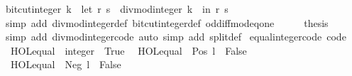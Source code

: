 \begin{isabellebody}
\ {\isachardoublequoteopen}bit{\isacharunderscore}{\kern0pt}cut{\isacharunderscore}{\kern0pt}integer\ k\ {\isacharequal}{\kern0pt}\ {\isacharparenleft}{\kern0pt}let\ {\isacharparenleft}{\kern0pt}r{\isacharcomma}{\kern0pt}\ s{\isacharparenright}{\kern0pt}\ {\isacharequal}{\kern0pt}\ divmod{\isacharunderscore}{\kern0pt}integer\ k\ {}\ in\ {\isacharparenleft}{\kern0pt}r{\isacharcomma}{\kern0pt}\ s\ {\isacharequal}{\kern0pt}\ {}{\isacharparenright}{\kern0pt}{\isacharparenright}{\kern0pt}{\isachardoublequoteclose}\isanewline
\ \ \ \ \isamarkupfalse%
\ {\isacharparenleft}{\kern0pt}simp\ add{\isacharcolon}{\kern0pt}\ divmod{\isacharunderscore}{\kern0pt}integer{\isacharunderscore}{\kern0pt}def\ bit{\isacharunderscore}{\kern0pt}cut{\isacharunderscore}{\kern0pt}integer{\isacharunderscore}{\kern0pt}def\ odd{\isacharunderscore}{\kern0pt}iff{\isacharunderscore}{\kern0pt}mod{\isacharunderscore}{\kern0pt}{}{\isacharunderscore}{\kern0pt}eq{\isacharunderscore}{\kern0pt}one{\isacharparenright}{\kern0pt}\isanewline
\ \ \isamarkupfalse%
\ \isamarkupfalse%
\ {\isacharquery}{\kern0pt}thesis\isanewline
\ \ \ \ \isamarkupfalse%
\ {\isacharparenleft}{\kern0pt}simp\ add{\isacharcolon}{\kern0pt}\ divmod{\isacharunderscore}{\kern0pt}integer{\isacharunderscore}{\kern0pt}code{\isacharparenright}{\kern0pt}\ {\isacharparenleft}{\kern0pt}auto\ simp\ add{\isacharcolon}{\kern0pt}\ split{\isacharunderscore}{\kern0pt}def{\isacharparenright}{\kern0pt}\isanewline
{}\isamarkupfalse%
%
\endisatagproof
{\isafoldproof}%
%
\isadelimproof
\isanewline
%
\endisadelimproof
\isanewline
{}\isamarkupfalse%
\ equal{\isacharunderscore}{\kern0pt}integer{\isacharunderscore}{\kern0pt}code\ {\isacharbrackleft}{\kern0pt}code{\isacharbrackright}{\kern0pt}{\isacharcolon}{\kern0pt}\isanewline
\ \ {\isachardoublequoteopen}HOL{\isachardot}{\kern0pt}equal\ {}\ {\isacharparenleft}{\kern0pt}{}{\isacharcolon}{\kern0pt}{\isacharcolon}{\kern0pt}integer{\isacharparenright}{\kern0pt}\ {\isasymlongleftrightarrow}\ True{\isachardoublequoteclose}\isanewline
\ \ {\isachardoublequoteopen}HOL{\isachardot}{\kern0pt}equal\ {}\ {\isacharparenleft}{\kern0pt}Pos\ l{\isacharparenright}{\kern0pt}\ {\isasymlongleftrightarrow}\ False{\isachardoublequoteclose}\isanewline
\ \ {\isachardoublequoteopen}HOL{\isachardot}{\kern0pt}equal\ {}\ {\isacharparenleft}{\kern0pt}Neg\ l{\isacharparenright}{\kern0pt}\ {\isasymlongleftrightarrow}\ False{\isachardoublequoteclose}\isanewline

\end{isabellebody}
